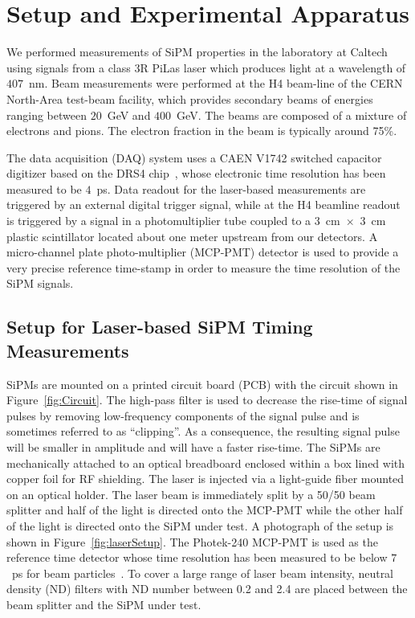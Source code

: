 \section{Setup and Experimental Apparatus }
\label{sec:setup}

We performed measurements of SiPM properties in the laboratory at Caltech using
signals from a class 3R PiLas laser which produces light at a wavelength of
$407$~nm. Beam measurements were performed at the H4 beam-line of the CERN
North-Area test-beam facility, which provides secondary beams of energies
ranging between $20$~GeV and $400$~GeV. The beams are composed of a mixture of
electrons and pions. The electron fraction in the beam is typically around 75\%.

The data acquisition (DAQ) system uses a CAEN V1742 switched capacitor digitizer
based on the DRS4 chip~\cite{DRS4}, whose electronic time resolution has been
measured to be $4$~ps. Data readout for the laser-based measurements are
triggered by an external digital trigger signal, while at the H4 beamline
readout is triggered by a signal in a photomultiplier tube coupled to a
$3$~$\mathrm{cm}$~$\times$~$3$~$\mathrm{cm}$ plastic scintillator located about
one meter upstream from our detectors. A micro-channel plate photo-multiplier
(MCP-PMT) detector is used to provide a very precise reference time-stamp in
order to measure the time resolution of the SiPM signals.

\subsection{Setup for Laser-based SiPM Timing Measurements}

SiPMs are mounted on a printed circuit board (PCB) with the circuit shown in
Figure~\ref{fig:Circuit}. The high-pass filter is used to decrease the rise-time
of signal pulses by removing low-frequency components of the signal pulse and is
sometimes referred to as ``clipping''. As a consequence, the resulting signal
pulse will be smaller in amplitude and will have a faster rise-time. The SiPMs
are mechanically attached to an optical breadboard enclosed within a box lined
with copper foil for RF shielding. The laser is injected via a light-guide fiber
mounted on an optical holder. The laser beam is immediately split by a 50/50
beam splitter and half of the light is directed onto the MCP-PMT while the other
half of the light is directed onto the SiPM under test. A photograph of the
setup is shown in Figure~\ref{fig:laserSetup}. The Photek-240 MCP-PMT is used as
the reference time detector whose time resolution has been measured to be below
$7$~ps for beam particles~\cite{MCPShowerMaxPaper}. To cover a large range of
laser beam intensity, neutral density (ND) filters with ND number between 0.2
and 2.4 are placed between the beam splitter and the SiPM under test.

